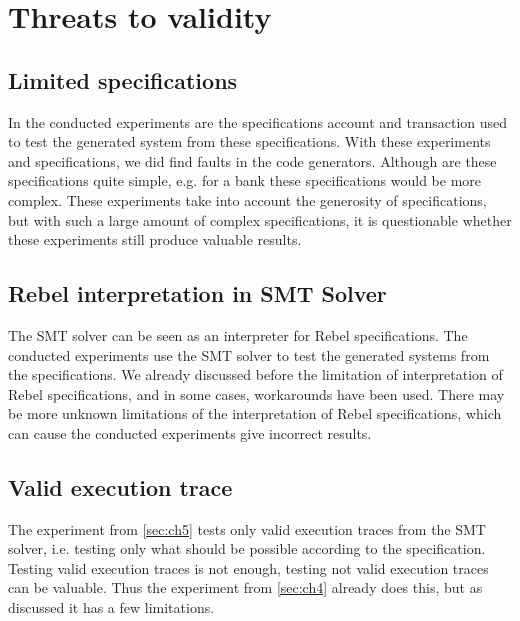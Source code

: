 \section{Threats to validity}

\subsection*{Limited specifications}
In the conducted experiments are the specifications account and transaction used to test the generated system from these specifications. With these experiments and specifications, we did find faults in the code generators. Although are these specifications quite simple, e.g. for a bank these specifications would be more complex. These experiments take into account the generosity of specifications, but with such a large amount of complex specifications, it is questionable whether these experiments still produce valuable results.

\subsection*{Rebel interpretation in SMT Solver}
The SMT solver can be seen as an interpreter for Rebel specifications. The conducted experiments use the SMT solver to test the generated systems from the specifications. We already discussed before the limitation of interpretation of Rebel specifications, and in some cases, workarounds have been used. There may be more unknown limitations of the interpretation of Rebel specifications, which can cause the conducted experiments give incorrect results.

\subsection*{Valid execution trace}
The experiment from \autoref{sec:ch5} tests only valid execution traces from the SMT solver, i.e. testing only what should be possible according to the specification. Testing valid execution traces is not enough, testing not valid execution traces can be valuable. Thus the experiment from \autoref{sec:ch4} already does this, but as discussed it has a few limitations. 

